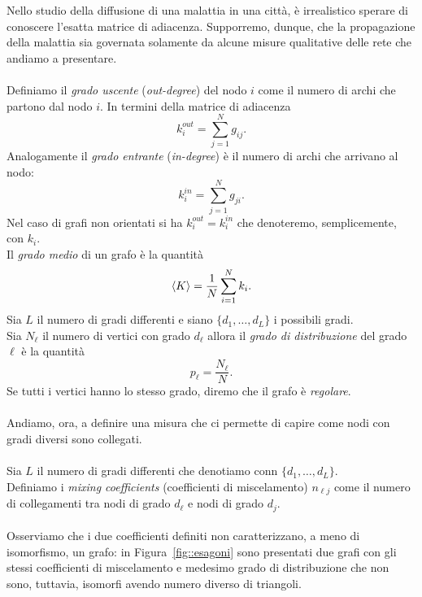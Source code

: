 Nello studio della diffusione di una malattia in una citt\`a, \`e irrealistico sperare di conoscere l'esatta matrice di adiacenza. Supporremo, dunque, che la propagazione della malattia sia governata solamente da alcune misure qualitative delle rete che andiamo a presentare.\\ \\
Definiamo il \textit{grado uscente} (\textit{out-degree})  del nodo $i$  come il numero di archi che partono dal nodo $i$. In termini della matrice di adiacenza
$$ k_i^{out} =\sum_{j=1}^N g_{ij}.$$
Analogamente il \textit{grado entrante} (\textit{in-degree}) \`e il numero di archi che arrivano al nodo:
$$ k_i^{in} = \sum_{j=1}^N g_{ji}.$$
Nel caso di grafi non orientati si ha $k_i^{out} = k_i^{in}$ che denoteremo, semplicemente, con $k_i$.\\
Il \textit{grado medio} di un grafo \`e la quantit\`a 
$$ \langle K \rangle = \frac{1}{N}\sum_{i=1}^N k_i.$$
Sia $L$ il numero di gradi differenti e siano $\{ d_1, \dots, d_L\}$ i possibili gradi.\\
Sia $N_\ell$ il numero di vertici con grado $d_\ell$ allora il \textit{grado di distribuzione} del grado $\ell$ \`e la quantit\`a
$$ p_\ell = \frac{N_\ell}{N}.$$
Se tutti i vertici hanno lo stesso grado, diremo che il grafo \`e \textit{regolare}.\\  \\
Andiamo, ora, a definire una misura che ci permette di capire  come nodi con gradi diversi sono collegati.\\ \\ 
Sia $L$ il numero di gradi differenti che denotiamo conn  $\{ d_1, \dots, d_L\}$.\\
Definiamo i \textit{mixing coefficients} (coefficienti di miscelamento) $n_{\ell j}$ come il numero di collegamenti tra nodi di grado $d_\ell$ e nodi di grado $d_j$.\\ \\ 
Osserviamo che i due coefficienti definiti non caratterizzano, a meno di isomorfismo, un grafo: in  Figura~\ref{fig::esagoni}  sono presentati due grafi con gli stessi coefficienti di miscelamento e medesimo  grado di distribuzione  che non sono, tuttavia, isomorfi avendo numero diverso di triangoli.


